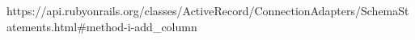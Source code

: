 https://api.rubyonrails.org/classes/ActiveRecord/ConnectionAdapters/SchemaStatements.html#method-i-add_column
